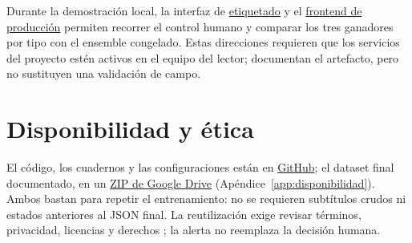 Durante la demostración local, la interfaz de \href{http://127.0.0.1:8765/}{etiquetado} y el \href{http://127.0.0.1:8876/}{frontend de producción} permiten recorrer el control humano y comparar los tres ganadores por tipo con el ensemble congelado. Estas direcciones requieren que los servicios del proyecto estén activos en el equipo del lector; documentan el artefacto, pero no sustituyen una validación de campo.

\section*{Disponibilidad y ética}

El código, los cuadernos y las configuraciones están en \href{https://github.com/lkoc/Trabajo_PLN-MIA-Grupo4}{GitHub}; el dataset final documentado, en un \href{https://drive.google.com/file/d/1-fAxh7Lj0RE_Imh2SL3fKPcc_TX2R_yJ/view?usp=drivesdk}{ZIP de Google Drive} (Apéndice~\ref{app:disponibilidad}). Ambos bastan para repetir el entrenamiento: no se requieren subtítulos crudos ni estados anteriores al JSON final. La reutilización exige revisar términos, privacidad, licencias y derechos \cite{youtube2023terms,aoir2020ethics}; la alerta no reemplaza la decisión humana.
